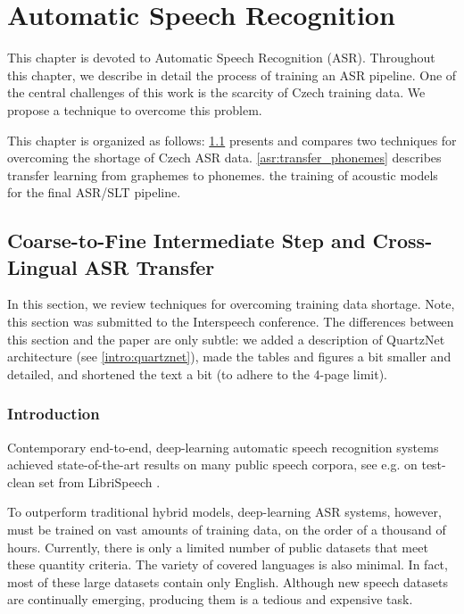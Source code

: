 \chapter{Automatic Speech Recognition}
\label{chapter:asr}

This chapter is devoted to Automatic Speech Recognition (ASR). Throughout this chapter, we describe in detail the process of training an ASR pipeline. One of the central challenges of this work is the scarcity of Czech training data. We propose a technique to overcome this problem. 

This chapter is organized as follows: \cref{asr:crosslingual_intermediate} presents and compares two techniques for overcoming the shortage of Czech ASR data. \cref{asr:transfer_phonemes} describes transfer learning from graphemes to phonemes.  the training of acoustic models for the final ASR/SLT pipeline. 


\section{Coarse-to-Fine Intermediate Step and Cross-Lingual ASR Transfer}
\label{asr:crosslingual_intermediate}

In this section, we review techniques for overcoming training data shortage. Note, this section was submitted to the Interspeech conference. The differences between this section and the paper are only subtle: we added a description of QuartzNet architecture (see \cref{intro:quartznet}), made the tables and figures a bit smaller and detailed, and shortened the text a bit (to adhere to the 4-page limit). 

\subsection{Introduction}

Contemporary end-to-end, deep-learning automatic speech recognition systems achieved state-of-the-art results on many public speech corpora, see e.g. 
on test-clean set from LibriSpeech .

To outperform traditional hybrid models, deep-learning ASR systems, however, must be trained on vast amounts of training data, on the order of a thousand of hours. Currently, there is only a limited number of public datasets that meet these quantity criteria. The variety of covered languages is also minimal. In fact, most of these large datasets contain only English. Although new speech datasets are continually emerging, producing them is a tedious and expensive task.

